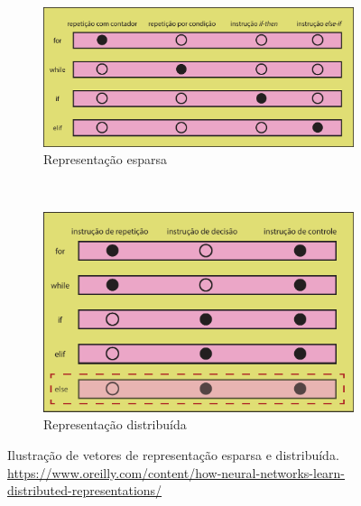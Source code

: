 \begin{figure}[H]
\centering
\begin{subfigure}{.7\textwidth}
  \centering
  \includegraphics[width=1\linewidth]{figuras/cap-trabalhos-relacionados/discrete-representation.pdf}
  \caption{Representação esparsa}
  \label{fig:discrete-representation}
\end{subfigure}%
\\
\begin{subfigure}{.7\textwidth}
  \centering
  \includegraphics[width=1\linewidth]{figuras/cap-trabalhos-relacionados/distributed-representation.pdf}
  \caption{Representação distribuída}
  \label{fig:distributed-representation}
\end{subfigure}

\caption{Ilustração de vetores de representação esparsa e distribuída. \url{https://www.oreilly.com/content/how-neural-networks-learn-distributed-representations/}}
\label{fig:discrete-vs-distributed-representation}
\end{figure}

